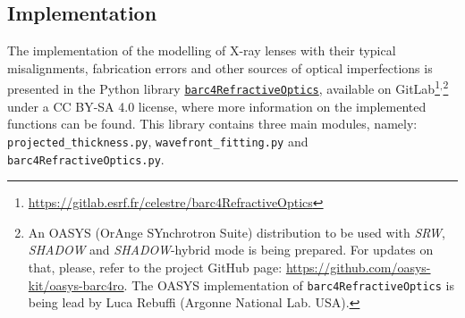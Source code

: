\begin{refsection}
\section{Implementation}

The implementation of the modelling of X-ray lenses with their typical misalignments, fabrication errors and other sources of optical imperfections is presented in the Python library \href{https://gitlab.esrf.fr/celestre/barc4RefractiveOptics}{\texttt{barc4RefractiveOptics}}, available on GitLab\footnote{\url{https://gitlab.esrf.fr/celestre/barc4RefractiveOptics}}$^,$\footnote{An OASYS (OrAnge SYnchrotron Suite) distribution to be used with \textit{SRW}, \textit{SHADOW} and \textit{SHADOW}-hybrid mode is being prepared. For updates on that, please, refer to the project GitHub page: \url{https://github.com/oasys-kit/oasys-barc4ro}. The OASYS implementation of \texttt{barc4RefractiveOptics} is being lead by Luca Rebuffi (Argonne National Lab. USA).} under a CC BY-SA 4.0 license, where more information on the implemented functions can be found. This library contains three main modules, namely: \texttt{projected\_thickness.py}, \texttt{wavefront\_fitting.py} and \texttt{barc4RefractiveOptics.py}.


\end{refsection}
